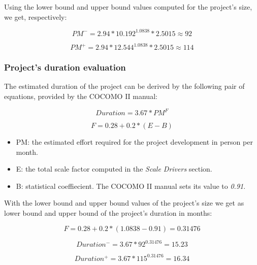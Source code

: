 Using the lower bound and upper bound values computed for the project's size, we get, respectively:
 
\begin{displaymath}
        PM^- = 2.94 * 10.192^{1.0838} * 2.5015 \approx 92 
\end{displaymath}

\begin{displaymath}
       PM^+ = 2.94 * 12.544^{1.0838} * 2.5015 \approx 114
\end{displaymath}

\subsubsection{Project's duration evaluation}

The estimated duration of the project can be derived by the following pair of equations, provided by the COCOMO II manual:

\begin{equation}
        Duration = 3.67 * PM^{F} 
\end{equation}

\begin{equation}
        F = 0.28 + 0.2 * (E - B)
\end{equation} 

\begin{itemize}
        \item PM: the estimated effort required for the project development in person per month.
	\item E: the total scale factor computed in the \textit{Scale Drivers} section.
	\item B: statistical coeffiecient. The COCOMO II manual sets its value to \textit{0.91}.
\end{itemize}

With the lower bound and upper bound values of the project's size we get as lower bound and upper bound of the project's duration in months:

\begin{displaymath}
        F = 0.28 + 0.2 * (1.0838 - 0.91) = 0.31476
\end{displaymath}

\begin{displaymath}
        Duration^- = 3.67 * 92^{0.31476} = 15.23
\end{displaymath}

\begin{displaymath}
        Duration^+ = 3.67 * 115^{0.31476} = 16.34
\end{displaymath}
